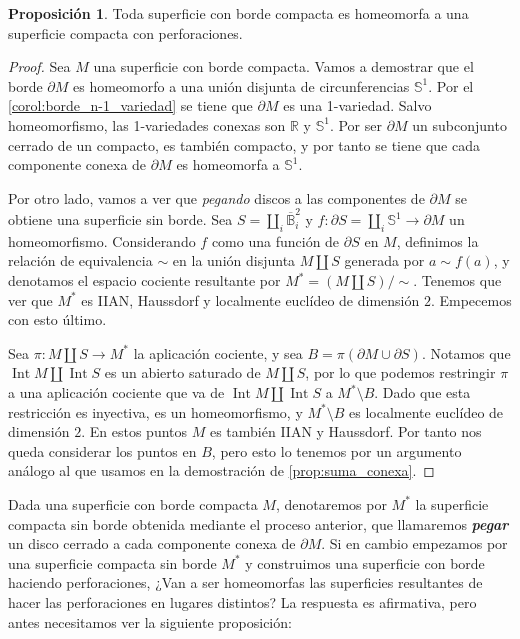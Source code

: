 \documentclass[10pt]{report}
\newcommand{\R}{\mathbb{R}}
\DeclareMathOperator{\interior}{Int} %
\newcommand{\enfatiza}[1]{\textbf{\textit{#1}}}
\theoremstyle{definition}
\newtheorem{prop}[defin]{Proposición}
\begin{document}
\begin{prop}\label{prop:borde_perforaciones}
Toda superficie con borde compacta es homeomorfa a una superficie compacta con perforaciones.
\end{prop}
\begin{proof}
Sea $M$ una superficie con borde compacta. Vamos a demostrar que el borde $\partial M$ es homeomorfo a una unión disjunta de circunferencias $\mathbb{S}^1$. Por el \autoref{corol:borde_n-1_variedad} se tiene que $\partial M$ es una 1-variedad. Salvo homeomorfismo, las 1-variedades conexas son $\R$ y $\mathbb{S}^1$. Por ser $\partial M$ un subconjunto cerrado de un compacto, es también compacto, y por tanto se tiene que cada componente conexa de $\partial M$ es homeomorfa a $\mathbb{S}^1$.

Por otro lado, vamos a ver que \textit{pegando} discos a las componentes de $\partial M$ se obtiene una superficie sin borde. Sea $S=\amalg_i \overline{\mathbb{B}}_i^2$ y $f:\partial S=\amalg_i \mathbb{S}^1\to \partial M$ un homeomorfismo. Considerando $f$ como una función de $\partial S$ en $M$, definimos la relación de equivalencia $\sim$ en la unión disjunta $M\amalg S$ generada por $a\sim f(a)$, y denotamos el espacio cociente resultante por $M^*=(M\amalg S)/\sim$. Tenemos que ver que $M^*$ es IIAN, Haussdorf y localmente euclídeo de dimensión $2$. Empecemos con esto último. 

Sea $\pi :M\amalg S\to M^*$ la aplicación cociente, y sea $B=\pi (\partial M\cup \partial S)$. Notamos que $\interior M\amalg \interior S$ es un abierto saturado de $M\amalg S$, por lo que podemos restringir $\pi$ a una aplicación cociente que va de $\interior M\amalg \interior S$ a $M^*\setminus B$. Dado que esta restricción es inyectiva, es un homeomorfismo, y $M^*\setminus B$ es localmente euclídeo de dimensión $2$. En estos puntos $M$ es también IIAN y Haussdorf. Por tanto nos queda considerar los puntos en $B$, pero esto lo tenemos por un argumento análogo al que usamos en la demostración de \autoref{prop:suma_conexa}. 
\end{proof}

Dada una superficie con borde compacta $M$, denotaremos por $M^*$ la superficie compacta sin borde obtenida mediante el proceso anterior, que llamaremos \enfatiza{pegar} un disco cerrado a cada componente conexa de $\partial M$. Si en cambio empezamos por una superficie compacta sin borde $M^*$ y construimos una superficie con borde haciendo perforaciones, ¿Van a ser homeomorfas las superficies resultantes de hacer las perforaciones en lugares distintos? La respuesta es afirmativa, pero antes necesitamos ver la siguiente proposición:
\end{document}

